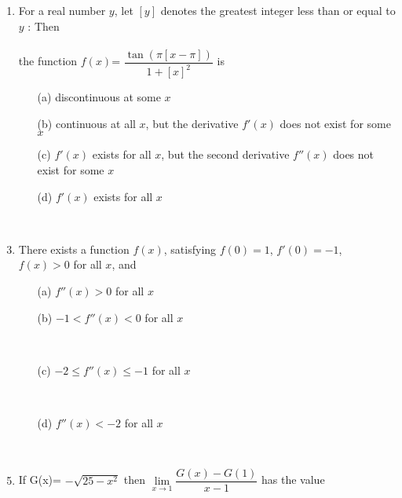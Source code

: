 \begin{enumerate}[label=\arabic*.,ref=\thesubsection.\theenumi]
\item For a real number $y$, let $\left[y\right]$ denotes the greatest integer less than or equal to $y$ : Then \\ \\the function $f(x)$= $\dfrac{\tan\left(\pi\left[x-\pi\right]\right)}{1+\left[x\right]^2}$ is \\
\begin{itemize}
\item[(a)] discontinuous at some $x$
\item[(b)] continuous at all $x$, but the derivative $f'(x)$ does not exist for some $x$
\item[(c)] $f'(x)$ exists for all $x$, but the second derivative $f''(x)$ does not exist for some $x$
\item[(d)] $f'(x)$ exists for all $x$
\end{itemize}

\item[~] \item There exists a function $f(x)$, satisfying $f(0)=1$, $f'(0)=-1$, $f(x)>0$ for all $x$, and
\begin{itemize}
\item[(a)] $f''(x)>0$ for all $x$\\ \item[(b)] $-1<f''(x)<0$ for all $x$ \item[~]\item[(c)] $-2\leq f''(x)\leq -1$ for all $x$ \item[~] \item[(d)] $f''(x)<-2$ for all $x$
\end{itemize}

\item[~] \item If G(x)= $-\sqrt{25-x^2}$ then $\lim\limits_{x \to 1}\dfrac{G(x)-G(1)}{x-1}$ has the value
\begin{itemize}
\end{itemize}


\end{enumerate}

